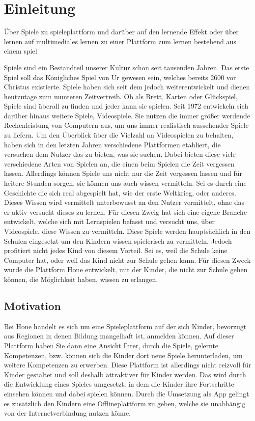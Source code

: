 \chapter{Einleitung}

Über Spiele zu spieleplattform und darüber auf den lernende Effekt oder über lernen auf multimediales lernen zu einer Plattform zum lernen bestehend aus einem spiel

Spiele sind ein Bestandteil unserer Kultur schon seit tausenden Jahren. Das erste Spiel soll das Königliches Spiel von Ur gewesen sein, welches bereits 2600 vor Christus existierte. Spiele haben sich seit dem jedoch weiterentwickelt und dienen heutzutage zum munteren Zeitvertreib. Ob als Brett, Karten oder Glückspiel, Spiele sind überall zu finden und jeder kann sie spielen. Seit 1972 entwickeln sich darüber hinaus weitere Spiele, Videospiele. Sie nutzen die immer größer werdende Rechenleistung von Computern aus, um uns immer realistisch aussehender Spiele zu liefern. 
Um den Überblick über die Vielzahl an Videospielen zu behalten, haben sich in den letzten Jahren verschiedene Plattformen etabliert, die versuchen dem Nutzer das zu bieten, was sie suchen. Dabei bieten diese viele verschiedene Arten von Spielen an, die einen beim Spielen die Zeit vergessen lassen.
Allerdings können Spiele uns nicht nur die Zeit vergessen lassen und für heitere Stunden sorgen, sie können uns auch wissen vermitteln. Sei es durch eine Geschichte die sich real abgespielt hat, wie der erste Weltkrieg, oder anderes. Dieses Wissen wird vermittelt unterbewusst an den Nutzer vermittelt, ohne das er aktiv versucht dieses zu lernen.
Für diesen Zweig hat sich eine eigene Branche entwickelt, welche sich mit Lernspielen befasst und versucht uns, über Videospiele, diese Wissen zu vermitteln. Diese Spiele werden hauptsächlich in den Schulen eingesetzt um den Kindern wissen spielerisch zu vermitteln. Jedoch profitiert nicht jedes Kind von diesem Vorteil. Sei es, weil die Schule keine Computer hat, oder weil das Kind nicht zur Schule gehen kann. Für diesen Zweck wurde die Plattform Hone entwickelt, mit der Kinder, die nicht zur Schule gehen können, die Möglichkeit haben, wissen zu erlangen. 

\section{Motivation}
Bei Hone handelt es sich um eine Spieleplattform auf der sich Kinder, bevorzugt aus Regionen in denen Bildung mangelhaft ist, anmelden können. Auf dieser Plattform haben Sie dann eine Ansicht Ihrer, durch die Spiele, gelernte Kompetenzen, bzw. können sich die Kinder dort neue Spiele herunterladen, um weitere Kompetenzen zu erwerben. Diese Plattform ist allerdings nicht reizvoll für Kinder gestaltet und soll deshalb attraktiver für Kinder werden. Das wird durch die Entwicklung eines Spieles umgesetzt, in dem die Kinder ihre Fortschritte einsehen können und dabei spielen können. Durch die Umsetzung als App gelingt es zusätzlich den Kindern eine Offlineplattform zu geben, welche sie unabhängig von der Internetverbindung nutzen könne. 

